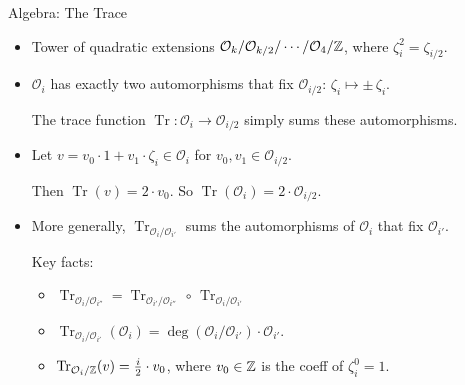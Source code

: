 \documentclass[shadow,xcolor=pdftex,svgnames,table,t]{beamer}
\DeclareMathOperator{\trace}{Tr}
\renewcommand{\O}{\mathcal{O}}
\begin{document}
\begin{frame}[label=trace]{Algebra: The Trace}
  \begin{itemize}
  \item<+-> Tower of quadratic extensions
    $\O_{k}/\O_{k/2}/\cdots/\O_{4}/\Z$, where $\zeta_{i}^{2} =
    \zeta_{i/2}$.

    \medskip
  \item<+-> $\O_{i}$ has exactly two automorphisms that fix
    $\O_{i/2}$: $\zeta_{i} \mapsto \pm\, \zeta_{i}$.

    \medskip The \alert{trace} function $\trace \colon \O_{i} \to
    \O_{i/2}$ simply sums these automorphisms.

    \medskip

  \item<+-> Let $v = v_{0} \cdot 1 + v_{1} \cdot \zeta_{i} \in \O_{i}$
    for $v_{0}, v_{1} \in \O_{i/2}$.

    \medskip Then $\trace(v) = 2 \cdot v_{0}$.  So $\trace(\O_{i}) = 2
    \cdot \O_{i/2}$.

    \medskip
  \item<+-> More generally, $\trace_{\O_{i}/\O_{i'}}$ sums the
    automorphisms of $\O_{i}$ that fix $\O_{i'}$.

    \smallskip Key facts:

    \medskip
    \begin{itemize}
    \item<+-> $\trace_{\O_{i}/\O_{i''}} = \trace_{\O_{i'}/\O_{i''}}\,
      \circ\, \trace_{\O_{i}/\O_{i'}}$

      \bigskip
    \item<+->[$\Rightarrow$] $\trace_{\O_{i}/\O_{i'}}(\O_{i}) =
      \deg(\O_{i}/\O_{i'}) \cdot \O_{i'}$.

      \bigskip
    \item<+->[$\Rightarrow$] $\trace_{\O_{i}/\Z}(v) = \tfrac{i}{2}
      \cdot v_{0}$, where $v_{0} \in \mathbb{Z}$ is the coeff of
      $\zeta_{i}^{0}=1$.
    \end{itemize}
  \end{itemize}
\end{frame}
\end{document}
